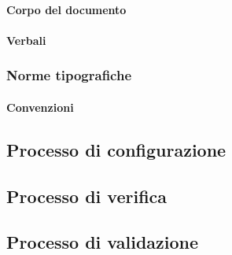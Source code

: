 \paragraph{Corpo del documento}

\paragraph{Verbali}

\subsubsection{Norme tipografiche}

\paragraph{Convenzioni}





\subsection{Processo di configurazione}

\subsection{Processo di verifica}

\subsection{Processo di validazione}
